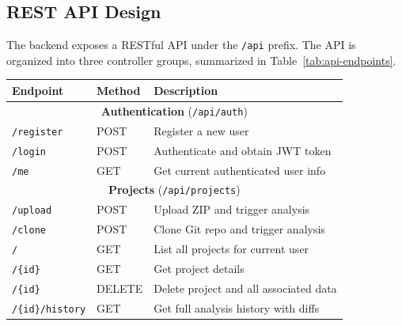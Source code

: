 \subsection{REST API Design}
\label{subsec:rest-api}

 \par The backend exposes a RESTful API \cite{Fielding2000} under the \texttt{/api} prefix. The API is organized into three controller groups, summarized in Table~\ref{tab:api-endpoints}.

\begin{table}[htbp]
    \centering
    \footnotesize
    \begin{tabular}{|l|l|p{6cm}|}
        \hline
        \textbf{Endpoint}          & \textbf{Method} & \textbf{Description}                             \\
        \hline\hline
        \multicolumn{3}{|c|}{\textbf{Authentication} (\texttt{/api/auth})} \\
        \hline
        \texttt{/register}         & POST            & Register a new user                              \\
        \hline
        \texttt{/login}            & POST            & Authenticate and obtain JWT token                \\
        \hline
        \texttt{/me}               & GET             & Get current authenticated user info              \\
        \hline\hline
        \multicolumn{3}{|c|}{\textbf{Projects} (\texttt{/api/projects})} \\
        \hline
        \texttt{/upload}           & POST            & Upload ZIP and trigger analysis                  \\
        \hline
        \texttt{/clone}            & POST            & Clone Git repo and trigger analysis              \\
        \hline
        \texttt{/}                 & GET             & List all projects for current user               \\
        \hline
        \texttt{/\{id\}}           & GET             & Get project details                              \\
        \hline
        \texttt{/\{id\}}           & DELETE          & Delete project and all associated data           \\
        \hline
        \texttt{/\{id\}/history}   & GET             & Get full analysis history with diffs             \\
        \hline

\end{tabular}
\end{table}
